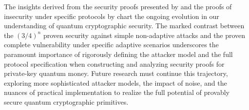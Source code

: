 \documentclass{article} %
\begin{document}
The insights derived from the security proofs presented by \citet{Molina2012Optimal} and the proofs of insecurity under specific protocols by \citet{Nagaj2016Adaptive} chart the ongoing evolution in our understanding of quantum cryptographic security. The marked contrast between the $(3/4)^n$ proven security against simple non-adaptive attacks and the proven complete vulnerability under specific adaptive scenarios underscores the paramount importance of rigorously defining the attacker model and the full protocol specification when constructing and analyzing security proofs for private-key quantum money. Future research must continue this trajectory, exploring more sophisticated attacker models, the impact of noise, and the nuances of practical implementation to realize the full potential of provably secure quantum cryptographic primitives.









\end{document}
